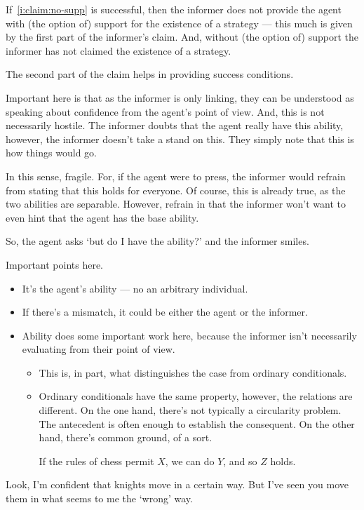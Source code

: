 \documentclass[10pt]{article}
\begin{document}
If~\ref{i:claim:no-supp} is successful, then the informer does not provide the agent with (the option of) support for the existence of a strategy --- this much is given by the first part of the informer's claim.
And, without (the option of) support the informer has not claimed the existence of a strategy.

The second part of the claim helps in providing success conditions.

{
  \color{red}
  Important here is that as the informer is only linking, they can be understood as speaking about confidence from the agent's point of view.
  And, this is not necessarily hostile.
  The informer doubts that the agent really have this ability, however, the informer doesn't take a stand on this.
  They simply note that this is how things would go.

  In this sense, fragile.
  For, if the agent were to press, the informer would refrain from stating that this holds for everyone.
  Of course, this is already true, as the two abilities are separable.
  However, refrain in that the informer won't want to even hint that the agent has the base ability.

  So, the agent asks `but do I have the ability?' and the informer smiles.
}

Important points here.

\begin{itemize}
\item It's the agent's ability --- no an arbitrary individual.
\item If there's a mismatch, it could be either the agent or the informer.
\item Ability does some important work here, because the informer isn't necessarily evaluating from their point of view.
  \begin{itemize}
  \item This is, in part, what distinguishes the case from ordinary conditionals.
  \item Ordinary conditionals have the same property, however, the relations are different.
    On the one hand, there's not typically a circularity problem.
    The antecedent is often enough to establish the consequent.
    On the other hand, there's common ground, of a sort.

    If the rules of chess permit \(X\), we can do \(Y\), and so \(Z\) holds.
  \end{itemize}
\end{itemize}

\begin{note}
  Look, I'm confident that knights move in a certain way.
  But I've seen you move them in what seems to me the `wrong' way.
\end{note}
\end{document}
